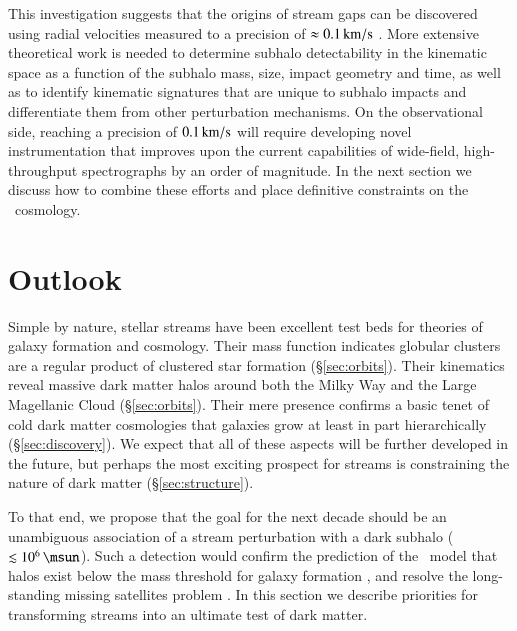 \documentclass[final,5p,times,twocolumn,authoryear]{elsarticle}
\begin{document}
This investigation suggests that the origins of stream gaps can be discovered using radial velocities measured to a precision of $\approx0.1\,\unit{\kms}$ \citep[similar to forecasts in][]{li:2019b}.
More extensive theoretical work is needed to determine subhalo detectability in the kinematic space as a function of the subhalo mass, size, impact geometry and time, as well as to identify kinematic signatures that are unique to subhalo impacts and differentiate them from other perturbation mechanisms.
On the observational side, reaching a precision of $0.1\,\unit{\kms}$ will require developing novel instrumentation that improves upon the current capabilities of wide-field, high-throughput spectrographs by an order of magnitude.
In the next section we discuss how to combine these efforts and place definitive constraints on the \lcdm\ cosmology.


\section{Outlook}
\label{sec:outlook}

Simple by nature, stellar streams have been excellent test beds for theories of galaxy formation and cosmology.
Their mass function indicates globular clusters are a regular product of clustered star formation (\S\ref{sec:orbits}).
Their kinematics reveal massive dark matter halos around both the Milky Way and the Large Magellanic Cloud (\S\ref{sec:orbits}).
Their mere presence confirms a basic tenet of cold dark matter cosmologies that galaxies grow at least in part hierarchically (\S\ref{sec:discovery}).
We expect that all of these aspects will be further developed in the future, but perhaps the most exciting prospect for streams is constraining the nature of dark matter (\S\ref{sec:structure}).

To that end, we propose that the goal for the next decade should be an unambiguous association of a stream perturbation with a dark subhalo ($\lesssim10^6\,\unit{\msun}$).
Such a detection would confirm the prediction of the \lcdm\ model that halos exist below the mass threshold for galaxy formation \citep{bullock:2000, benson:2002, somerville:2002, benitez-llambay:2020}, and resolve the long-standing missing satellites problem \citep{klypin:1999}.
In this section we describe priorities for transforming streams into an ultimate test of dark matter.
\end{document}
